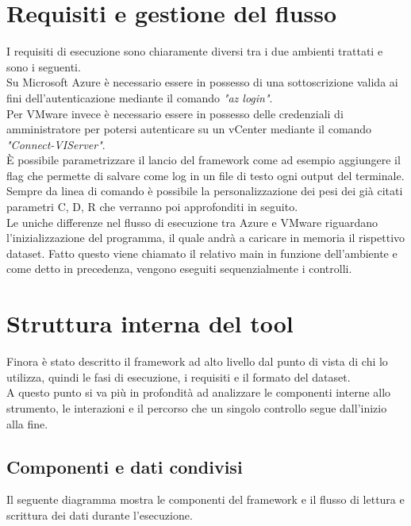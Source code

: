 \documentclass[a4paper,11pt]{report}
\begin{document}
\section{Requisiti e gestione del flusso}

I requisiti di esecuzione sono chiaramente diversi tra i due ambienti trattati e sono i seguenti. \\
Su Microsoft Azure è necessario essere in possesso di una sottoscrizione valida ai fini dell'autenticazione mediante il comando \textit{"az login"}. \\
Per VMware invece è necessario essere in possesso delle credenziali di amministratore per potersi autenticare su un vCenter mediante il comando \textit{"Connect-VIServer"}.\\

È possibile parametrizzare il lancio del framework come ad esempio aggiungere il flag che permette di salvare come log in un file di testo ogni output del terminale. Sempre da linea di comando è possibile la personalizzazione dei pesi dei già citati parametri C, D, R che verranno poi approfonditi in seguito. \\


Le uniche differenze nel flusso di esecuzione tra Azure e VMware riguardano l'inizializzazione del programma, il quale andrà a caricare in memoria il rispettivo dataset. Fatto questo viene chiamato il relativo main in funzione dell'ambiente e come detto in precedenza, vengono eseguiti sequenzialmente i controlli.


\section{Struttura interna del tool}

Finora è stato descritto il framework ad alto livello dal punto di vista di chi lo utilizza, quindi le fasi di esecuzione, i requisiti e il formato del dataset.\\
A questo punto si va più in profondità ad analizzare le componenti interne allo strumento, le interazioni e il percorso che un singolo controllo segue dall'inizio alla fine.


\subsection{Componenti e dati condivisi}

Il seguente diagramma mostra le componenti del framework e il flusso di lettura e scrittura dei dati durante l'esecuzione.
\end{document}
